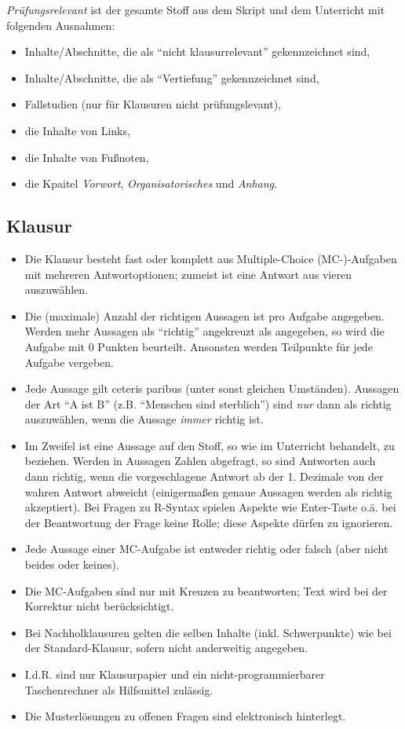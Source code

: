 \documentclass[12pt,ngerman,]{book}
\providecommand{\tightlist}{%
  \setlength{\itemsep}{0pt}\setlength{\parskip}{0pt}}
\begin{document}
\emph{Prüfungsrelevant} ist der gesamte Stoff aus dem Skript und dem
Unterricht mit folgenden Ausnahmen:

\begin{itemize}
\tightlist
\item
  Inhalte/Abschnitte, die als ``nicht klausurrelevant'' gekennzeichnet
  sind,
\item
  Inhalte/Abschnitte, die als ``Vertiefung'' gekennzeichnet sind,
\item
  Fallstudien (nur für Klausuren nicht prüfungslevant),
\item
  die Inhalte von Links,
\item
  die Inhalte von Fußnoten,
\item
  die Kpaitel \emph{Vorwort}, \emph{Organisatorisches} und
  \emph{Anhang}.
\end{itemize}

\subsection{Klausur}\label{klausur}

\begin{itemize}
\item
  Die Klausur besteht fast oder komplett aus Multiple-Choice
  (MC-)-Aufgaben mit mehreren Antwortoptionen; zumeist ist eine Antwort
  aus vieren auszuwählen.
\item
  Die (maximale) Anzahl der richtigen Aussagen ist pro Aufgabe
  angegeben. Werden mehr Aussagen als ``richtig'' angekreuzt als
  angegeben, so wird die Aufgabe mit 0 Punkten beurteilt. Ansonsten
  werden Teilpunkte für jede Aufgabe vergeben.
\item
  Jede Aussage gilt ceteris paribus (unter sonst gleichen Umständen).
  Aussagen der Art ``A ist B'' (z.B. ``Menschen sind sterblich'') sind
  \emph{nur} dann als richtig auszuwählen, wenn die Aussage \emph{immer}
  richtig ist.
\item
  Im Zweifel ist eine Aussage auf den Stoff, so wie im Unterricht
  behandelt, zu beziehen. Werden in Aussagen Zahlen abgefragt, so sind
  Antworten auch dann richtig, wenn die vorgeschlagene Antwort ab der 1.
  Dezimale von der wahren Antwort abweicht (einigermaßen genaue Aussagen
  werden als richtig akzeptiert). Bei Fragen zu R-Syntax spielen Aspekte
  wie Enter-Taste o.ä. bei der Beantwortung der Frage keine Rolle; diese
  Aspekte dürfen zu ignorieren.
\item
  Jede Aussage einer MC-Aufgabe ist entweder richtig oder falsch (aber
  nicht beides oder keines).
\item
  Die MC-Aufgaben sind nur mit Kreuzen zu beantworten; Text wird bei der
  Korrektur nicht berücksichtigt.
\item
  Bei Nachholklausuren gelten die selben Inhalte (inkl. Schwerpunkte)
  wie bei der Standard-Klausur, sofern nicht anderweitig angegeben.
\item
  I.d.R. sind nur Klausurpapier und ein nicht-programmierbarer
  Taschenrechner als Hilfsmittel zulässig.
\item
  Die Musterlösungen zu offenen Fragen sind elektronisch hinterlegt.
\end{itemize}
\end{document}
